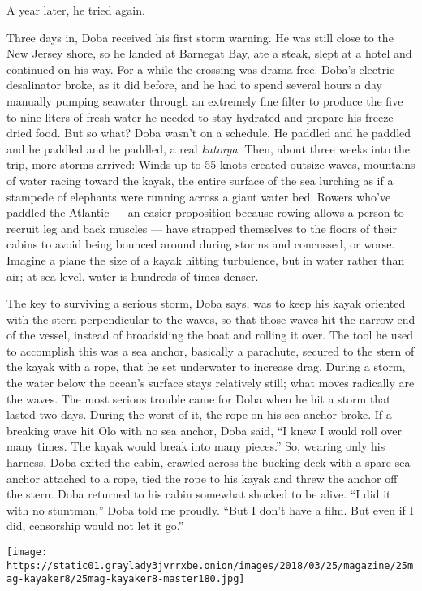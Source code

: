 A year later, he tried again.

Three days in, Doba received his first storm warning. He was still close
to the New Jersey shore, so he landed at Barnegat Bay, ate a steak,
slept at a hotel and continued on his way. For a while the crossing was
drama-free. Doba's electric desalinator broke, as it did before, and he
had to spend several hours a day manually pumping seawater through an
extremely fine filter to produce the five to nine liters of fresh water
he needed to stay hydrated and prepare his freeze-dried food. But so
what? Doba wasn't on a schedule. He paddled and he paddled and he
paddled and he paddled, a real \emph{katorga}. Then, about three weeks
into the trip, more storms arrived: Winds up to 55 knots created outsize
waves, mountains of water racing toward the kayak, the entire surface of
the sea lurching as if a stampede of elephants were running across a
giant water bed. Rowers who've paddled the Atlantic --- an easier
proposition because rowing allows a person to recruit leg and back
muscles --- have strapped themselves to the floors of their cabins to
avoid being bounced around during storms and concussed, or worse.
Imagine a plane the size of a kayak hitting turbulence, but in water
rather than air; at sea level, water is hundreds of times denser.

The key to surviving a serious storm, Doba says, was to keep his kayak
oriented with the stern perpendicular to the waves, so that those waves
hit the narrow end of the vessel, instead of broadsiding the boat and
rolling it over. The tool he used to accomplish this was a sea anchor,
basically a parachute, secured to the stern of the kayak with a rope,
that he set underwater to increase drag. During a storm, the water below
the ocean's surface stays relatively still; what moves radically are the
waves. The most serious trouble came for Doba when he hit a storm that
lasted two days. During the worst of it, the rope on his sea anchor
broke. If a breaking wave hit Olo with no sea anchor, Doba said, ``I
knew I would roll over many times. The kayak would break into many
pieces.'' So, wearing only his harness, Doba exited the cabin, crawled
across the bucking deck with a spare sea anchor attached to a rope, tied
the rope to his kayak and threw the anchor off the stern. Doba returned
to his cabin somewhat shocked to be alive. ``I did it with no
stuntman,'' Doba told me proudly. ``But I don't have a film. But even if
I did, censorship would not let it go.''

\texttt{[image: https://static01.graylady3jvrrxbe.onion/images/2018/03/25/magazine/25mag-kayaker8/25mag-kayaker8-master180.jpg]}

